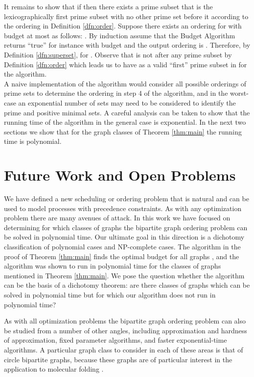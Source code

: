 \documentclass[letterpaper,11pt,abstracton]{scrartcl}
\newcommand{\qed}{\hfill}
\begin{document}
It remains to show that if  then there exists a prime subset 
that is the lexicographically first prime subset with no other
prime set before it according to the ordering in Definition \ref{dfn:order}.
Suppose there exists an ordering for  with budget at most
 as follows: .
By induction assume that the Budget Algorithm returns ``true'' for
instance  with
budget  and the output ordering is
. Therefore, by Definition
\ref{dfn:superset},  for
. Observe that  is not after any prime subset
by Definition \ref{dfn:order} which leads us to have  as a valid
``first'' prime subset in  for the algorithm.
\qed \\



A naive implementation of the algorithm would consider all possible
orderings of prime sets to determine the ordering in step 4 of the algorithm, and
in the worst-case an exponential number of sets may need to be considered to
identify the prime and positive minimal sets.  A careful analysis can be taken
to show that the running time of the algorithm in the general case is
exponential.  In the next two sections we show that for the graph classes
of Theorem \ref{thm:main} the running time is polynomial.







\section{Future Work and Open Problems} \label{sec:future}

We have defined a new scheduling or ordering problem that is
natural and can be used to model processes with precedence
constraints.  As with any optimization problem there are many avenues
of attack.  In this work we have focused on determining for which
classes of graphs the bipartite graph ordering problem can be solved in
polynomial time.  Our ultimate goal in this direction is a dichotomy
classification of polynomial cases and NP-complete cases.  The algorithm
in the proof of Theorem \ref{thm:main} finds the optimal budget for
all graphs , and the algorithm was shown to run in polynomial time
for the classes of graphs mentioned in Theorem \ref{thm:main}.  We pose the
question whether the algorithm can be the basis of a dichotomy theorem:
are there classes of graphs which can be solved in polynomial time but
for which our algorithm does not run in polynomial time?


As with all optimization problems the bipartite graph ordering problem can
also be studied from a number of other angles, including approximation
and hardness of approximation, fixed parameter algorithms, and faster
exponential-time algorithms.
A particular graph class to consider in
each of these areas is that of circle bipartite graphs, because these graphs are
of particular interest in the application to molecular folding \cite{GFWT08,MH98,TMRM09}.
\end{document}
